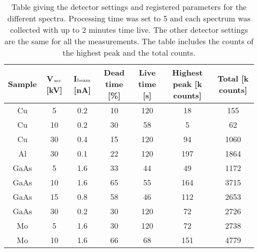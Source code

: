 \begin{table}[p]
    \centering
    \caption{
        Table giving the detector settings and registered parameters for the different spectra.
        Processing time was set to 5 and each spectrum was collected with up to 2 minutes time live.
        The other detector settings are the same for all the measurements.
        The table includes the counts of the highest peak and the total counts.
    }
    \label{tab:results:detector:settings}
    \begin{tabular}{ccccccc}
        Sample & V$_\textnormal{acc}$ [kV] & I$_\textnormal{beam}$ [nA] & Dead time [\%] & Live time [s] & Highest peak [k counts] & Total [k counts] \\
        \hline
        Cu     & 5                         & 0.2                        & 10             & 120           & 18                      & 155              \\
        Cu     & 10                        & 0.2                        & 30             & 58            & 5                       & 62               \\
        Cu     & 30                        & 0.4                        & 15             & 120           & 94                      & 1060             \\
        Al     & 30                        & 0.1                        & 22             & 120           & 197                     & 1864             \\
        GaAs   & 5                         & 1.6                        & 33             & 44            & 49                      & 1172             \\
        GaAs   & 10                        & 1.6                        & 65             & 55            & 164                     & 3715             \\
        GaAs   & 15                        & 0.8                        & 58             & 46            & 112                     & 2653             \\
        GaAs   & 30                        & 0.2                        & 30             & 120           & 72                      & 2726             \\
        Mo     & 5                         & 1.6                        & 30             & 120           & 72                      & 2738             \\
        Mo     & 10                        & 1.6                        & 66             & 68            & 151                     & 4779             \\

\end{tabular}
\end{table}
